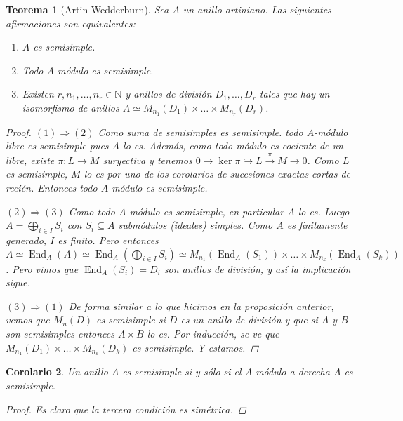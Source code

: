 \documentclass[12pt]{book}
\newtheorem{teo}{Teorema}[section]
\newtheorem{cor}[teo]{Corolario}
\theoremstyle{definition}
\DeclareMathOperator{\End}{End}
\begin{document}
\begin{teo}[Artin-Wedderburn]
Sea $A$ un anillo artiniano. Las siguientes afirmaciones son equivalentes:
\begin{enumerate}
\item $A$ es semisimple.
\item Todo $A$-módulo es semisimple.
\item Existen $r,n_1,\ldots , n_r\in\mathbb{N}$ y anillos de división $D_1,\ldots , D_r$ tales que hay un isomorfismo de anillos $A\simeq M_{n_1}(D_1)\times \ldots \times M_{n_r}(D_r)$.
\end{enumerate}
\begin{proof}

$(1)\Longrightarrow(2)$ Como suma de semisimples es semisimple. todo $A$-módulo libre es semisimple pues $A$ lo es. Además, como todo módulo es cociente de un libre, existe $\pi:L\to M$ suryectiva y tenemos $0\longrightarrow \ker\pi\hookrightarrow L\stackrel{\pi}{\longrightarrow}M\longrightarrow 0$. Como $L$ es semisimple, $M$ lo es por uno de los corolarios de sucesiones exactas cortas de recién. Entonces todo $A$-módulo es semisimple.

$(2)\Longrightarrow (3)$ Como todo $A$-módulo es semisimple, en particular $A$ lo es. Luego $A=\displaystyle\bigoplus_{i\in I}S_i$ con $S_i\subseteq A$ submódulos (ideales) simples. Como $A$ es finitamente generado, $I$ es finito. Pero entonces $A\simeq \End_A(A) \simeq \End_A\left(\displaystyle\bigoplus_{i\in I}S_i\right)\simeq M_{n_1}(\End_A(S_1))\times \ldots \times M_{n_k}(\End_A(S_k))$. Pero vimos que $\End_A(S_i)=D_i$ son anillos de división, y así la implicación sigue.

$(3)\Longrightarrow (1)$ De forma similar a lo que hicimos en la proposición anterior, vemos que $M_n(D)$ es semisimple si $D$ es un anillo de división y que si $A$ y $B$ son semisimples entonces $A\times B$ lo es. Por inducción, se ve que $M_{n_1}(D_1)\times \ldots \times M_{n_k}(D_k)$ es semisimple. Y estamos.

\end{proof}
\end{teo}

\begin{cor}
Un anillo $A$ es semisimple si y sólo si el $A$-módulo a derecha $A$ es semisimple.
\begin{proof}
Es claro que la tercera condición es simétrica.
\end{proof}
\end{cor}
\end{document}
